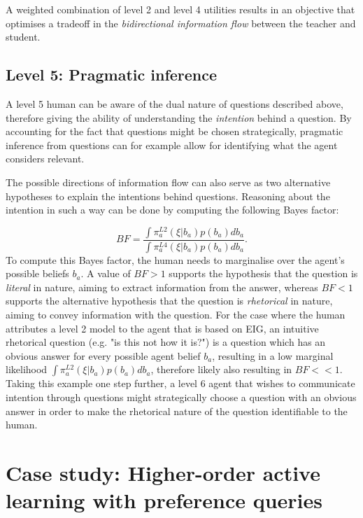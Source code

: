 \documentclass[letterpaper]{article} %
\begin{document}
A weighted combination of level 2 and level 4 utilities results in an objective that optimises a tradeoff in the \textit{bidirectional information flow} between the teacher and student. 

\subsection{Level 5: Pragmatic inference}

A level 5 human can be aware of the dual nature of questions described above, therefore giving the ability of understanding the \textit{intention} behind a question. By accounting for the fact that questions might be chosen strategically, pragmatic inference from questions can for example allow for identifying what the agent considers relevant. 

The possible directions of information flow can also serve as two alternative hypotheses to explain the intentions behind questions. Reasoning about the intention in such a way can be done by computing the following Bayes factor:

\begin{equation}
    BF = \frac{\int\pi_a^{L2}(\xi | b_a)p(b_a)db_a}{\int\pi_a^{L4}(\xi | b_a)p(b_a)db_a}.
\end{equation}
To compute this Bayes factor, the human needs to marginalise over the agent's possible beliefs $b_a$. A value of $BF>1$ supports the hypothesis that the question is \textit{literal} in nature, aiming to extract information from the answer, whereas $BF<1$ supports the alternative hypothesis that the question is \textit{rhetorical} in nature, aiming to convey information with the question. For the case where the human attributes a level 2 model to the agent that is based on EIG, an intuitive rhetorical question (e.g. "is this not how it is?") is a question which has an obvious answer for every possible agent belief $b_a$, resulting in a low marginal likelihood $\int\pi_a^{L2}(\xi | b_a)p(b_a)db_a$, therefore likely also resulting in $BF << 1$. Taking this example one step further, a level 6 agent that wishes to communicate intention through questions might strategically choose a question with an obvious answer in order to make the rhetorical nature of the question identifiable to the human.

\section{Case study: Higher-order active learning with preference queries}
\end{document}
